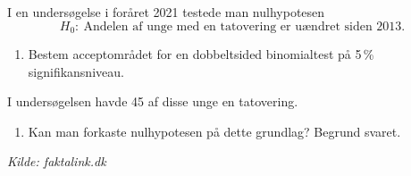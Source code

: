 \documentclass[10pt,a4paper,table]{article}
\begin{document}
I en undersøgelse i foråret 2021 testede man nulhypotesen
\[
H_0:\ \text{Andelen af unge med en tatovering er uændret siden 2013}.
\]

\begin{enumerate}[resume]
    \item Bestem acceptområdet for en dobbelt­sided binomialtest på 5\,\% signifikansniveau.
\end{enumerate}

I undersøgelsen havde 45 af disse unge en tatovering. 
\begin{enumerate}[resume]
    \item Kan man forkaste nulhypotesen på dette grundlag? Begrund svaret.
\end{enumerate}

\textit{Kilde: faktalink.dk}
\end{document}
